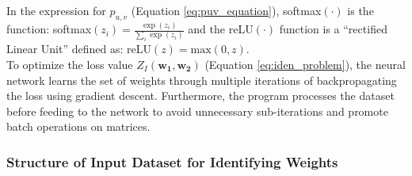 \documentclass[12pt]{article}
\newcommand{\matr}[1]{\mathbf{#1}}  %
\begin{document}
    In the expression for $p_{u,v}$ (Equation \ref{eq:puv_equation}), softmax$(\cdot)$ is the function: softmax$(z_i) = \frac{\exp(z_i)}{\sum_{i}\exp(z_i)}$ and the reLU$(\cdot)$ function is a ``rectified Linear Unit'' defined as: reLU$(z) = \text{max}(0, z)$.\\
    To optimize the loss value $Z_I(\matr{w_1}, \matr{w_2})$ (Equation \ref{eq:iden_problem}), the neural network learns the set of weights through multiple iterations of backpropagating the loss using gradient descent. Furthermore, the program processes the dataset before feeding to the network to avoid unnecessary sub-iterations and promote batch operations on matrices. 
    
    \subsubsection{Structure of Input Dataset for Identifying Weights} \label{sec:Structure of Input Dataset for Identifying Weights}
\end{document}
